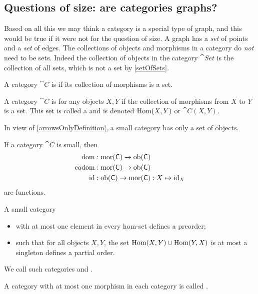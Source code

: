 \subsection{Questions of size: are categories graphs?}
Based on all this we may think a category is a special type of graph, and this would be true if it were not for the question of size. A graph has a \textit{set} of points and a \textit{set} of edges. The collections of objects and morphisms in a category do \emph{not} need to be sets. Indeed the collection of objects in the category $\cat{Set}$ is the collection of all sets, which is not a set by \ref{setOfSets}.

\begin{definition}
A category $\cat{C}$ is  if its collection of morphisms is a set.

A category $\cat{C}$ is  for any objects $X,Y$ if the collection of morphisms from $X$ to $Y$ is a set. This set is called a  and is denoted $\operatorname{Hom}(X,Y)$ or $\cat{C}(X,Y)$.
\end{definition}
In view of \ref{arrowsOnlyDefinition}, a small category has only a set of objects.

\begin{lemma}
If a category $\cat{C}$ is small, then
\begin{align*}
\operatorname{dom}&: \operatorname{mor}(\mathsf{C}) \to \operatorname{ob}(\mathsf{C}) \\
\operatorname{codom}&: \operatorname{mor}(\mathsf{C}) \to \operatorname{ob}(\mathsf{C}) \\
\operatorname{id}&: \operatorname{ob}(\mathsf{C}) \to \operatorname{mor}(\mathsf{C}): X\mapsto \operatorname{id}_X
\end{align*}
are functions.
\end{lemma}

\begin{lemma}
A small category
\begin{itemize}
\item with at most one element in every hom-set defines a preorder;
\item such that for all objects $X,Y$, the set $\operatorname{Hom}(X,Y)\cup \operatorname{Hom}(Y,X)$ is at most a singleton defines a partial order.
\end{itemize}
\end{lemma}
We call such categories  and .

\begin{definition}
A category with at most one morphism in each category is called .
\end{definition}


